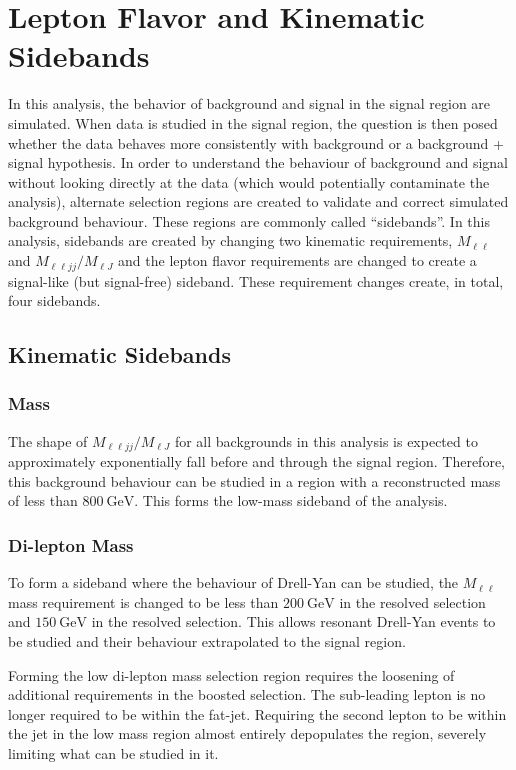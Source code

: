\section{Lepton Flavor and Kinematic Sidebands}
In this analysis, the behavior of background and signal in the signal region are simulated. When data is studied in the signal region, the question is then posed whether the data behaves more consistently with background or a background + signal hypothesis. In order to understand the behaviour of background and signal without looking directly at the data (which would potentially contaminate the analysis), alternate selection regions are created to validate and correct simulated background behaviour. These regions are commonly called ``sidebands''. In this analysis, sidebands are created by changing two kinematic requirements, $M_{\ell\ell}$ and $M_{\ell\ell jj}/M_{\ell J}$ and the lepton flavor requirements are changed to create a signal-like (but signal-free) sideband. These requirement changes create, in total, four sidebands.

\subsection{Kinematic Sidebands}

\subsubsection{\WR Mass}
The shape of $M_{\ell\ell jj}/M_{\ell J}$ for all backgrounds in this analysis is expected to approximately exponentially fall before and through the signal region. Therefore, this background behaviour can be studied in a region with a reconstructed \WR mass of less than $\SI{800}{\GeV}$. This forms the low-mass sideband of the analysis.

\subsubsection{Di-lepton Mass}
To form a sideband where the behaviour of Drell-Yan can be studied, the $M_{\ell\ell}$ mass requirement is changed to be less than $\SI{200}{\GeV}$ in the resolved selection and $\SI{150}{\GeV}$ in the resolved selection. This allows resonant Drell-Yan events to be studied and their behaviour extrapolated to the signal region.

Forming the low di-lepton mass selection region requires the loosening of additional requirements in the boosted selection. The sub-leading lepton is no longer required to be within the fat-jet. Requiring the second lepton to be within the jet in the low mass region almost entirely depopulates the region, severely limiting what can be studied in it.

